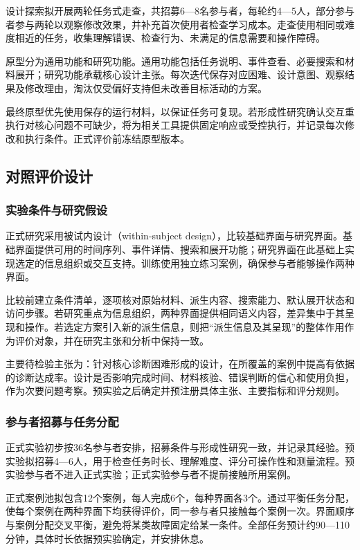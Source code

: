 设计探索拟开展两轮任务式走查，共招募6—8名参与者，每轮约4—5人，部分参与者参与两轮以观察修改效果，并补充首次使用者检查学习成本。走查使用相同或难度相近的任务，收集理解错误、检查行为、未满足的信息需要和操作障碍。

原型分为通用功能和研究功能。通用功能包括任务说明、事件查看、必要搜索和材料展开；研究功能承载核心设计主张。每次迭代保存对应困难、设计意图、观察结果及修改理由，淘汰仅受偏好支持但未改善目标活动的方案。

最终原型优先使用保存的运行材料，以保证任务可复现。若形成性研究确认交互重执行对核心问题不可缺少，将为相关工具提供固定响应或受控执行，并记录每次修改和执行条件。正式评价前冻结原型版本。

\subsection{对照评价设计}

\subsubsection{实验条件与研究假设}

正式研究采用被试内设计（within-subject design），比较基础界面与研究界面。基础界面提供可用的时间序列、事件详情、搜索和展开功能；研究界面在此基础上实现选定的信息组织或交互支持。训练使用独立练习案例，确保参与者能够操作两种界面。

比较前建立条件清单，逐项核对原始材料、派生内容、搜索能力、默认展开状态和访问步骤。若研究重点为信息组织，两种界面提供相同语义内容，差异集中于其呈现和操作。若选定方案引入新的派生信息，则把“派生信息及其呈现”的整体作用作为评价对象，并在研究主张和分析中保持一致。

主要待检验主张为：针对核心诊断困难形成的设计，在所覆盖的案例中提高有依据的诊断达成率。设计是否影响完成时间、材料核验、错误判断的信心和使用负担，作为次要问题考察。预实验之后确定并预注册具体主张、主要指标和评分规则。

\subsubsection{参与者招募与任务分配}

正式实验初步按36名参与者安排，招募条件与形成性研究一致，并记录其经验。预实验拟招募4—6人，用于检查任务时长、理解难度、评分可操作性和测量流程。预实验参与者不进入正式实验；正式实验参与者不提前接触所用案例。

正式案例池拟包含12个案例，每人完成6个，每种界面各3个。通过平衡任务分配，使每个案例在两种界面下均获得评价，同一参与者只接触每个案例一次。界面顺序与案例分配交叉平衡，避免将某类故障固定给某一条件。全部任务预计约90—110分钟，具体时长依据预实验确定，并安排休息。

